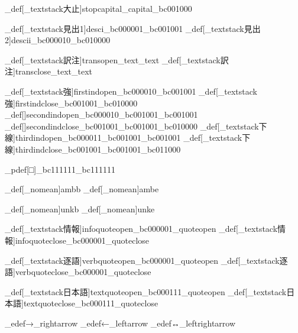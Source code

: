 \brl@char_def[\brl@char_textstack{大止}{}]{stopcapital}{\brl@char@alias_capital\brl@char_bc001000}

\brl@char_def[\brl@char_textstack{見出1}{}]{desci}{\brl@char_bc000001\brl@char_bc001001}
\brl@char_def[\brl@char_textstack{見出2}{}]{descii}{\brl@char_bc000010\brl@char_bc010000}


\brl@char_def[\brl@char_textstack{訳注}{}]{transopen}{\brl@char@alias_text\brl@char@alias_text}%
\brl@char_def[\brl@char_textstack{訳注}{}]{transclose}{\brl@char@alias_text\brl@char@alias_text}%




\brl@char_def[\brl@char_textstack{強}{}]{firstindopen}{\brl@char_bc000010\brl@char_bc001001}
\brl@char_def[\brl@char_textstack{強}{}]{firstindclose}{\brl@char_bc001001\brl@char_bc010000}
\brl@char_def[]{secondindopen}{\brl@char_bc000010\brl@char_bc001001\brl@char_bc001001}
\brl@char_def[]{secondindclose}{\brl@char_bc001001\brl@char_bc001001\brl@char_bc010000}
\brl@char_def[\brl@char_textstack{下線}{}]{thirdindopen}{\brl@char_bc000011\brl@char_bc001001\brl@char_bc001001}
\brl@char_def[\brl@char_textstack{下線}{}]{thirdindclose}{\brl@char_bc001001\brl@char_bc001001\brl@char_bc011000}

\brl@char_pdef[□]{\qedsymbol}{\brl@char_bc111111\brl@char_bc111111}


\brl@char_def[\brl@char_nomean]{ambb}{\brl@char@toks{\global\brl@text@ambtrue}}
\brl@char_def[\brl@char_nomean]{ambe}{\brl@char@toks{\global\brl@text@ambfalse}}

\brl@char_def[\brl@char_nomean]{unkb}{\brl@char@toks{\global\brl@text@unktrue}}
\brl@char_def[\brl@char_nomean]{unke}{\brl@char@toks{\global\brl@text@unkfalse}}


\brl@char_def[\brl@char_textstack{情報}{}]{infoquoteopen}{\brl@char_bc000001\brl@char@alias_quoteopen}
\brl@char_def[\brl@char_textstack{情報}{}]{infoquoteclose}{\brl@char_bc000001\brl@char@alias_quoteclose}

\brl@char_def[\brl@char_textstack{逐語}{}]{verbquoteopen}{\brl@char_bc000001\brl@char@alias_quoteopen}
\brl@char_def[\brl@char_textstack{逐語}{}]{verbquoteclose}{\brl@char_bc000001\brl@char@alias_quoteclose}


\brl@char_def[\brl@char_textstack{日本語}{}]{textquoteopen}{\brl@char_bc000111\brl@char@alias_quoteopen}
\brl@char_def[\brl@char_textstack{日本語}{}]{textquoteclose}{\brl@char_bc000111\brl@char@alias_quoteclose}



\brl@char_edef{→}{\brl@char@alias_rightarrow}
\brl@char_edef{←}{\brl@char@alias_leftarrow}
\brl@char_edef{↔}{\brl@char@alias_leftrightarrow}

